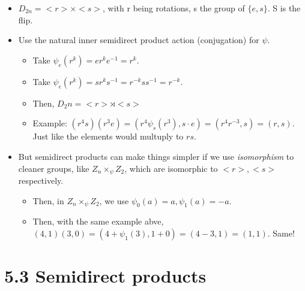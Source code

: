 \documentclass[11pt, oneside]{article}   	%
\begin{document}
\begin{itemize}
\item $D_{2n} = <r> \times <s>$, with r being rotations, s the group of $\{e, s\}$.  S is the flip.
\item Use the natural  inner semidirect product action (conjugation) for $\psi$.
\begin{itemize}
\item Take $\psi_e(r^k) = er^ke^{-1} = r^k.$ 
\item Take $\psi_e(r^k) = sr^ks^{-1} = r^{-k}ss^{-1} = r^{-k}$.
\item Then, $D_2n = <r> \rtimes <s>$ 
\item Example: $(r^4s)(r^3e) = (r^4\psi_s(r^3), s \cdot e) = (r^4r^{-3}, s) = (r,s)$.  Just like the elements would multuply to $rs$.
\end{itemize}
\item But semidirect products can make things simpler if we use \emph{isomorphism} to cleaner groups, like $Z_n \times_{\psi} Z_2$, which are isomorphic to $<r>, <s>$ respectively.
\begin{itemize}
  \item Then, in  $Z_n \times_{\psi} Z_2$, we use $\psi_0(a) = a, \psi_1(a) = -a$.
  \item Then, with the same example abve, $(4,1)(3,0) = (4 + \psi_1(3), 1 + 0) = (4 - 3, 1) = (1,1)$.  Same!
  \end{itemize}
\end{itemize}

 \section{5.3 Semidirect products}
\end{document}
